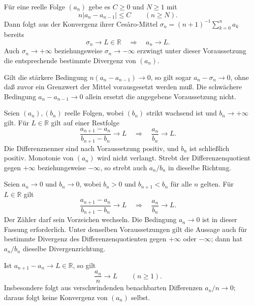 \begin{theorem}
\label{b21guide:thm:cesaro-converse}
Für eine reelle Folge $(a_n)$ gebe es $C\geq0$ und $N\geq1$ mit
\[
 n|a_n-a_{n-1}|\leq C\qquad(n\geq N).
\]
Dann folgt aus der Konvergenz ihrer Cesàro-Mittel
$\sigma_n=(n+1)^{-1}\sum_{k=0}^{n}a_k$ bereits
\[
 \sigma_n\to L\in\mathbb R\quad\Longrightarrow\quad a_n\to L.
\]
Auch $\sigma_n\to+\infty$ beziehungsweise $\sigma_n\to-\infty$
erzwingt unter dieser Voraussetzung die entsprechende bestimmte
Divergenz von $(a_n)$.

Gilt die stärkere Bedingung $n(a_n-a_{n-1})\to0$, so gilt sogar
$a_n-\sigma_n\to0$, ohne daß zuvor ein Grenzwert der Mittel
vorausgesetzt werden muß.
Die schwächere Bedingung $a_n-a_{n-1}\to0$ allein ersetzt
die angegebene Voraussetzung nicht.
\end{theorem}

\begin{theorem}
\label{b21guide:thm:stolz}
Seien $(a_n),(b_n)$ reelle Folgen, wobei $(b_n)$ strikt wachsend
ist und $b_n\to+\infty$ gilt.
Für $L\in\mathbb R$ gilt auf einer Restfolge
\[
 \frac{a_{n+1}-a_n}{b_{n+1}-b_n}\longrightarrow L
 \quad\Longrightarrow\quad
 \frac{a_n}{b_n}\longrightarrow L.
\]
Die Differenznenner sind nach Voraussetzung positiv,
und $b_n$ ist schließlich positiv.
Monotonie von $(a_n)$ wird nicht verlangt.
Strebt der Differenzenquotient gegen $+\infty$ beziehungsweise
$-\infty$, so strebt auch $a_n/b_n$ in dieselbe Richtung.
\end{theorem}

\begin{theorem}
\label{b21guide:thm:stolz-zero}
Seien $a_n\to0$ und $b_n\to0$, wobei $b_n>0$ und
$b_{n+1}<b_n$ für alle $n$ gelten.
Für $L\in\mathbb R$ gilt
\[
 \frac{a_{n+1}-a_n}{b_{n+1}-b_n}\to L
 \quad\Longrightarrow\quad
 \frac{a_n}{b_n}\to L.
\]
Der Zähler darf sein Vorzeichen wechseln.
Die Bedingung $a_n\to0$ ist in dieser Fassung erforderlich.
Unter denselben Voraussetzungen gilt die Aussage auch für
bestimmte Divergenz des Differenzenquotienten gegen
$+\infty$ oder $-\infty$; dann hat $a_n/b_n$ dieselbe
Divergenzrichtung.
\end{theorem}

\begin{theorem}
Ist $a_{n+1}-a_n\to L\in\mathbb R$, so gilt
\[
 \frac{a_n}{n}\longrightarrow L\qquad(n\geq1).
\]
Insbesondere folgt aus verschwindenden benachbarten Differenzen
$a_n/n\to0$; daraus folgt keine Konvergenz von $(a_n)$ selbst.
\end{theorem}

